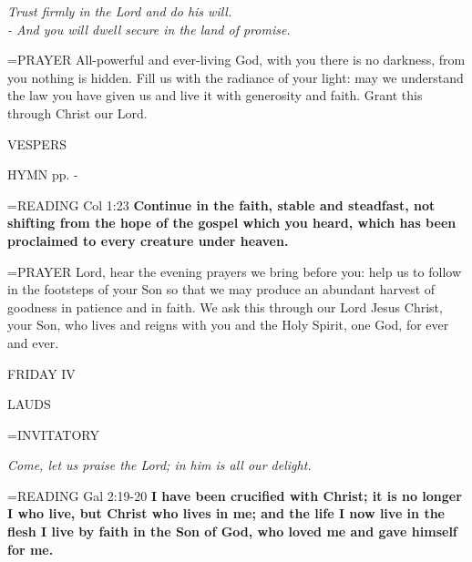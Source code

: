 \begin{center}
\textit{Trust firmly in the Lord and do his will.\\
- And you will dwell secure in the land of promise.}
\end{center}

\hangindent=\parindent \small{PRAYER  All-powerful and ever-living God, with you there is no darkness, from you nothing is hidden. Fill us with the radiance of your light: may we understand the law you have given us and live it with generosity and faith. Grant this through Christ our Lord.}

\begin{flushleft}\normalsize VESPERS\\\end{flushleft}
HYMN pp. \pageref{ordinaryTime:fourthHymn} - \pageref{ordinaryTime:sixthHymn}

\hangindent=\parindent \small{READING} Col 1:23 \textbf{Continue in the faith, stable and steadfast, not shifting from the hope of the gospel which you heard, which has been proclaimed to every creature under heaven.\\}

\hangindent=\parindent \small{PRAYER  Lord, hear the evening prayers we bring before you: help us to follow in the footsteps of your Son so that we may produce an abundant harvest of goodness in patience and in faith. We ask this through our Lord Jesus Christ, your Son, who lives and reigns with you and the Holy Spirit, one God, for ever and ever.}

\begin{center}
\normalsize FRIDAY IV
\end{center}

\begin{flushleft}\normalsize LAUDS\\\end{flushleft}

\hangindent=\parindent \small{INVITATORY}
\begin{center}
\textit{Come, let us praise the Lord; in him is all our delight.\\}
\end{center}

\hangindent=\parindent \small{READING} Gal 2:19-20 \textbf{I have been crucified with Christ; it is no longer I who live, but Christ who lives in me; and the life I now live in the flesh I live by faith in the Son of God, who loved me and gave himself for me.\\}

